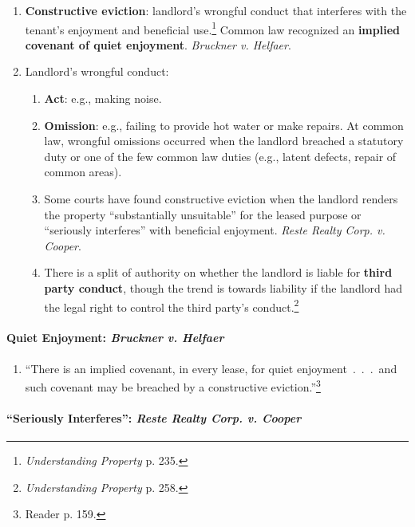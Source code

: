 \begin{enumerate}
    \item \textbf{Constructive eviction}: landlord's wrongful conduct that 
    interferes with the tenant's enjoyment and beneficial 
    use.\footnote{\emph{Understanding Property} p. 235.} Common law recognized 
    an \textbf{implied covenant of quiet enjoyment}. \emph{Bruckner v. 
    Helfaer}.
    \item Landlord's wrongful conduct:
    \begin{enumerate}
        \item \textbf{Act}: e.g., making noise.
        \item \textbf{Omission}: e.g., failing to provide hot water or make 
        repairs. At common law, wrongful omissions occurred when the landlord 
        breached a statutory duty or one of the few common law duties (e.g., 
        latent defects, repair of common areas).
        \item Some courts have found constructive eviction when the landlord 
        renders the property ``substantially unsuitable'' for the leased 
        purpose or ``seriously interferes'' with beneficial enjoyment. 
        \emph{Reste Realty Corp. v. Cooper}.
        \item There is a split of authority on whether the landlord is liable 
        for \textbf{third party conduct}, though the trend is towards 
        liability if the landlord had the legal right to control the third 
        party's conduct.\footnote{\emph{Understanding Property} p. 258.}
    \end{enumerate}
\end{enumerate}

\paragraph{Quiet Enjoyment: \emph{Bruckner v. Helfaer}} %

\begin{enumerate}
    \item ``There is an implied covenant, in every lease, for quiet 
    enjoyment~.~.~.~and such covenant may be breached by a constructive 
    eviction.''\footnote{Reader p. 159.}
\end{enumerate}

\paragraph{``Seriously Interferes'': \emph{Reste Realty Corp. v. Cooper}} 

